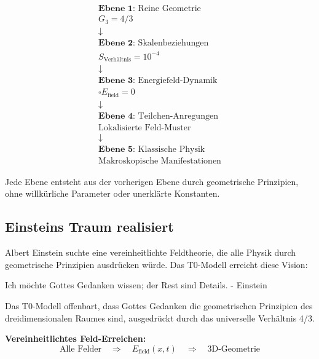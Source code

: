 \documentclass[12pt,a4paper]{report}
\begin{document}
	\begin{equation}
		\begin{array}{c}
			\textbf{Ebene 1:} \text{ Reine Geometrie} \\
			G_3 = 4/3 \\
			\downarrow \\
			\textbf{Ebene 2:} \text{ Skalenbeziehungen} \\
			S_{\text{Verhältnis}} = 10^{-4} \\
			\downarrow \\
			\textbf{Ebene 3:} \text{ Energiefeld-Dynamik} \\
			\square E_{\text{field}} = 0 \\
			\downarrow \\
			\textbf{Ebene 4:} \text{ Teilchen-Anregungen} \\
			\text{Lokalisierte Feld-Muster} \\
			\downarrow \\
			\textbf{Ebene 5:} \text{ Klassische Physik} \\
			\text{Makroskopische Manifestationen}
		\end{array}
	\end{equation}
	
	Jede Ebene entsteht aus der vorherigen Ebene durch geometrische Prinzipien, ohne willkürliche Parameter oder unerklärte Konstanten.
	
	\subsection{Einsteins Traum realisiert}
	\label{subsec:einstein_dream}
	
	Albert Einstein suchte eine vereinheitlichte Feldtheorie, die alle Physik durch geometrische Prinzipien ausdrücken würde. Das T0-Modell erreicht diese Vision:
	
	\begin{tcolorbox}[colback=green!5!white,colframe=green!75!black,title=Einsteins Vision realisiert]
		Ich möchte Gottes Gedanken wissen; der Rest sind Details. - Einstein
		
		Das T0-Modell offenbart, dass Gottes Gedanken die geometrischen Prinzipien des dreidimensionalen Raumes sind, ausgedrückt durch das universelle Verhältnis 4/3.
	\end{tcolorbox}
	
	\textbf{Vereinheitlichtes Feld-Erreichen:}
	\begin{equation}
		\text{Alle Felder} \quad \Rightarrow \quad E_{\text{field}}(x,t) \quad \Rightarrow \quad \text{3D-Geometrie}
	\end{equation}
	
\end{document}
